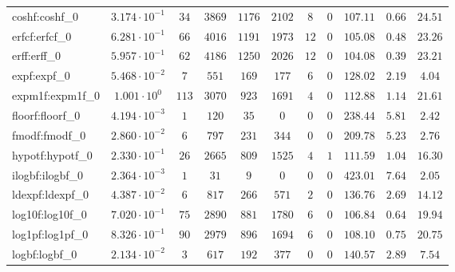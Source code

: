 \begin{tabular}{|l|c|c|c|c|c|c|c|c|c|c|}
coshf:coshf\_0               & $ 3.174 \cdot 10^{-1} $ & $ 34     $ & $ 3869  $ & $ 1176  $ & $ 2102  $ & $ 8   $ & $ 0 $ & $ 107.11      $ & $ 0.66    $ & $ 24.51   $ \\
erfcf:erfcf\_0               & $ 6.281 \cdot 10^{-1} $ & $ 66     $ & $ 4016  $ & $ 1191  $ & $ 1973  $ & $ 12  $ & $ 0 $ & $ 105.08      $ & $ 0.48    $ & $ 23.26   $ \\
erff:erff\_0                 & $ 5.957 \cdot 10^{-1} $ & $ 62     $ & $ 4186  $ & $ 1250  $ & $ 2026  $ & $ 12  $ & $ 0 $ & $ 104.08      $ & $ 0.39    $ & $ 23.21   $ \\
expf:expf\_0                 & $ 5.468 \cdot 10^{-2} $ & $ 7      $ & $ 551   $ & $ 169   $ & $ 177   $ & $ 6   $ & $ 0 $ & $ 128.02      $ & $ 2.19    $ & $ 4.04    $ \\
expm1f:expm1f\_0             & $ 1.001 \cdot 10^{0}  $ & $ 113    $ & $ 3070  $ & $ 923   $ & $ 1691  $ & $ 4   $ & $ 0 $ & $ 112.88      $ & $ 1.14    $ & $ 21.61   $ \\
floorf:floorf\_0             & $ 4.194 \cdot 10^{-3} $ & $ 1      $ & $ 120   $ & $ 35    $ & $ 0     $ & $ 0   $ & $ 0 $ & $ 238.44      $ & $ 5.81    $ & $ 2.42    $ \\
fmodf:fmodf\_0               & $ 2.860 \cdot 10^{-2} $ & $ 6      $ & $ 797   $ & $ 231   $ & $ 344   $ & $ 0   $ & $ 0 $ & $ 209.78      $ & $ 5.23    $ & $ 2.76    $ \\
hypotf:hypotf\_0             & $ 2.330 \cdot 10^{-1} $ & $ 26     $ & $ 2665  $ & $ 809   $ & $ 1525  $ & $ 4   $ & $ 1 $ & $ 111.59      $ & $ 1.04    $ & $ 16.30   $ \\
ilogbf:ilogbf\_0             & $ 2.364 \cdot 10^{-3} $ & $ 1      $ & $ 31    $ & $ 9     $ & $ 0     $ & $ 0   $ & $ 0 $ & $ 423.01      $ & $ 7.64    $ & $ 2.05    $ \\
ldexpf:ldexpf\_0             & $ 4.387 \cdot 10^{-2} $ & $ 6      $ & $ 817   $ & $ 266   $ & $ 571   $ & $ 2   $ & $ 0 $ & $ 136.76      $ & $ 2.69    $ & $ 14.12   $ \\
log10f:log10f\_0             & $ 7.020 \cdot 10^{-1} $ & $ 75     $ & $ 2890  $ & $ 881   $ & $ 1780  $ & $ 6   $ & $ 0 $ & $ 106.84      $ & $ 0.64    $ & $ 19.94   $ \\
log1pf:log1pf\_0             & $ 8.326 \cdot 10^{-1} $ & $ 90     $ & $ 2979  $ & $ 896   $ & $ 1694  $ & $ 6   $ & $ 0 $ & $ 108.10      $ & $ 0.75    $ & $ 20.75   $ \\
logbf:logbf\_0               & $ 2.134 \cdot 10^{-2} $ & $ 3      $ & $ 617   $ & $ 192   $ & $ 377   $ & $ 0   $ & $ 0 $ & $ 140.57      $ & $ 2.89    $ & $ 7.54    $ \\

\end{tabular}

